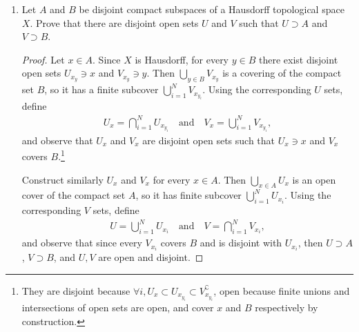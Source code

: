 \documentclass[12pt,letterpaper]{article}
\renewcommand{\dist}[2]{d\!\left(#1,#2\right)}
\begin{document}
\begin{enumerate}
\begin{proof}
	(ii) If we modify the property to be $\dist{f(x)}{f(y)}\leq\dist{x}{y},$	then we do not have uniqueness since the identity $f(x)=x$ satisfies the property. Existence is still guaranteed.
	\end{proof}

\item Let $A$ and $B$ be disjoint compact subspaces of a Hausdorff topological space $X$. Prove that there are disjoint open sets $U$ and $V$ such that $U\supset A$ and $V\supset B$.
\begin{proof}
Let $x\in A$. Since $X$ is Hausdorff, for every $y\in B$ there exist disjoint open sets $U_{x_y}\ni x$ and $V_{x_y}\ni y$. Then $\bigcup_{y\in B}V_{x_y}$ is a covering of the compact set $B$, so it has a finite subcover $\bigcup_{i=1}^NV_{x_{y_i}}$. Using the corresponding $U$ sets, define 
\begin{align*}
U_x=\bigcap_{i=1}^NU_{x_{y_i}} \quad\text{and}\quad V_x=\bigcup_{i=1}^NV_{x_{y_i}},
\end{align*}
and observe that $U_x$ and $V_x$ are disjoint open sets such that $U_x\ni x$ and $V_x$ covers $B$.\footnote{They are disjoint because $\forall i, U_x\subset U_{x_{y_{i}}}\subset V_{x_{y_{i}}}^\complement$, open because finite unions and intersections of open sets are open, and cover $x$ and $B$ respectively by construction.}

Construct similarly $U_x$ and $V_x$ for every $x\in A$. Then $\bigcup_{x\in A}U_x$ is an open cover of the compact set $A$, so it has finite subcover $\bigcup_{i=1}^NU_{x_i}$. Using the corresponding $V$ sets, define 
\begin{align*}
U=\bigcup_{i=1}^NU_{x_i} \quad\text{and}\quad V=\bigcap_{i=1}^NV_{x_i},
\end{align*}
and observe that since every $V_{x_i}$ covers $B$ and is disjoint with $U_{x_i}$, then $U\supset A$, $V\supset B$, and $U,V$ are open and disjoint. 
\end{proof}

\end{enumerate}
\end{document}
